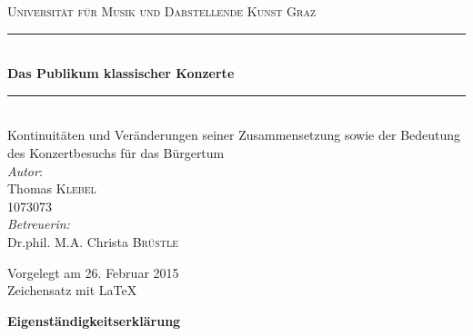 \documentclass[a4paper, german, oneside]{scrbook}
\date{\displaydate{date}}
\begin{document}
	\begin{titlepage}
	
		\begin{center}



		\textsc{\LARGE Universität für Musik und Darstellende Kunst Graz}\\[1.5cm]



		\newcommand{\HRule}{\rule{\linewidth}{0.5mm}}
		\HRule \\[0.4cm]
		{ \huge \bfseries Das Publikum klassischer Konzerte}\\[0.4cm]

		\HRule \\[0.5cm] %


		\Large Kontinuitäten und Veränderungen seiner Zusammensetzung sowie der Bedeutung des Konzertbesuchs für das Bürgertum\\[2cm]

		\Large \emph{Autor}:\\
		Thomas \textsc{Klebel}\\[0.1cm]
		\large 1073073\\[1cm]

		\Large \emph{Betreuerin:}\\
		 Dr.phil. M.A. Christa \textsc{Brüstle}\\[1cm]



		\vfill

		\Large{Vorgelegt am 26. Februar 2015}\\[1cm]
		\normalsize{Zeichensatz mit \LaTeX}
		

		\end{center}

	\end{titlepage}

	



\newpage
\thispagestyle{empty}
\begin{center}
\Large\bfseries Eigenständigkeitserklärung
\end{center}
\end{document}
